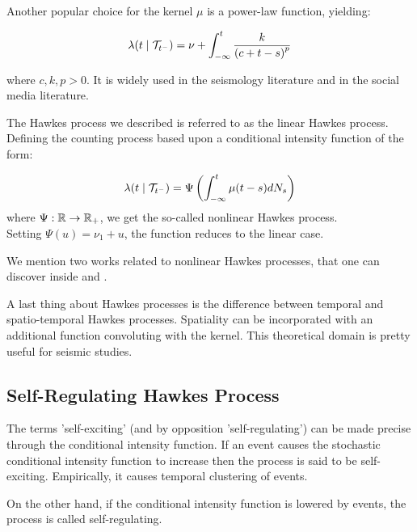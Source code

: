\documentclass[11pt]{book}
\begin{document}
\begin{remarque}
Another popular choice for the kernel $\mu$ is a power-law function, yielding:

$$ \lambda (t \mid \mathcal{T}_{t^-} ) = \nu + \int_{- \infty }^t \frac{ k }{ \left ( c + t - s \right ) ^p } $$

where $c,k,p > 0$. It is widely used in the seismology literature and in the social media literature.
\end{remarque}




\begin{remarque}
The Hawkes process we described is referred to as the linear Hawkes process. Defining the counting process based upon a conditional intensity function of the form:

$$ \lambda (t \mid \mathcal{T}_{t^-}) = \Psi \left ( \int_{-\infty}^t \mu(t-s) dN_s \right ) $$ where $\Psi : \mathbb{R} \to \mathbb{R}_+$, we get the so-called nonlinear Hawkes process. \\Setting $\Psi(u) = \nu_1 + u$, the function reduces to the linear case. 

We mention two works related to nonlinear Hawkes processes, that one can discover inside \cite{nonlinearHP1} and \cite{nonlinearHP2}.
\end{remarque}

\begin{remarque}
A last thing about Hawkes processes is the difference between temporal and spatio-temporal Hawkes processes. Spatiality can be incorporated with an additional function convoluting with the kernel. This theoretical domain is pretty useful for seismic studies.
\end{remarque}



\subsection{Self-Regulating Hawkes Process}
\label{section:obral}

The terms 'self-exciting'  (and by opposition 'self-regulating') can be made precise through the conditional intensity function. If an event causes the stochastic conditional intensity function to increase then the process is said to be self-exciting. Empirically, it causes temporal clustering of events. 

On the other hand, if the conditional intensity function is lowered by events, the process is called self-regulating. 
\end{document}
